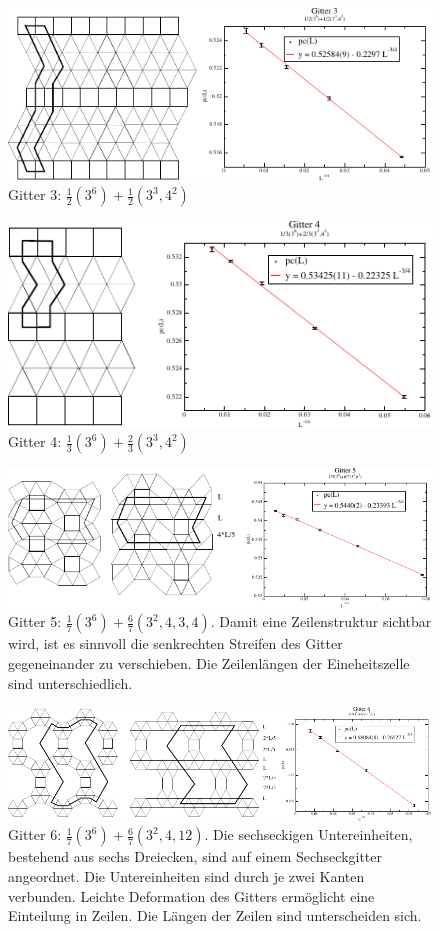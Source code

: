 \begin{figure}[p]
  \includegraphics{./Numerik-figs/2-uni-3_fig}
  \caption{Gitter 3:  $\frac{1}{2}(3^6)+\frac{1}{2}(3^3,4^2)$}
\end{figure}
\begin{figure}[p]
  \includegraphics{./Numerik-figs/2-uni-4_fig}
  \caption{Gitter 4: $\frac{1}{3}(3^6)+\frac{2}{3}(3^3,4^2)$}
\end{figure}
\clearpage
\begin{figure}[p]
  \includegraphics{./Numerik-figs/2-uni-5_fig}
  \caption{Gitter 5: $\frac{1}{7}(3^6)+\frac{6}{7}(3^2,4,3,4)$. Damit eine Zeilenstruktur sichtbar wird, ist es sinnvoll die senkrechten Streifen des Gitter gegeneinander zu verschieben. Die Zeilenl\"angen der Eineheitszelle sind unterschiedlich.}
  \label{fig:appgitter5}
\end{figure}
\begin{figure}[p]
  \includegraphics{./Numerik-figs/2-uni-6_fig}
  \caption{Gitter 6:  $\frac{1}{7}(3^6)+\frac{6}{7}(3^2,4,12)$. Die sechseckigen Untereinheiten, bestehend aus sechs Dreiecken, sind auf einem Sechseckgitter angeordnet. Die Untereinheiten sind durch je zwei Kanten verbunden. Leichte Deformation des Gitters erm\"oglicht eine Einteilung in Zeilen. Die L\"angen der Zeilen sind unterscheiden sich. }
\label{fig:appgitter6}
\end{figure}
